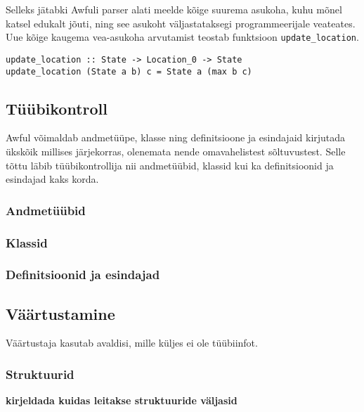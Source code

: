 \documentclass[12pt]{article}
\newcommand\markus[1]{\textcolor{roheline}{\textbf{#1}}}
\begin{document}
      Selleks jätabki Awfuli parser alati meelde kõige suurema asukoha, kuhu mõnel katsel edukalt jõuti, ning see asukoht väljastataksegi programmeerijale veateates. Uue kõige kaugema vea-asukoha arvutamist teostab funktsioon \verb!update_location!.

        \begin{verbatim}update_location :: State -> Location_0 -> State
update_location (State a b) c = State a (max b c)\end{verbatim}
    \subsection{Tüübikontroll}
      Awful võimaldab andmetüüpe, klasse ning definitsioone ja esindajaid kirjutada ükskõik millises järjekorras, olenemata nende omavahelistest sõltuvustest. Selle tõttu läbib tüübikontrollija nii andmetüübid, klassid kui ka definitsioonid ja esindajad kaks korda.
      \subsubsection{Andmetüübid}
        
      \subsubsection{Klassid}
        
      \subsubsection{Definitsioonid ja esindajad}
        
    \subsection{Väärtustamine}
      Väärtustaja kasutab avaldisi, mille küljes ei ole tüübiinfot.
\begin{comment}
    Add_Int_expression_2 |
    Add_Int'_expression_2 Integer |
    Algebraic_expression_2 String [Expression_2] |
    Application_expression_2 Expression_2 Expression_2 |
    Field_expression_2 String |
    Function_expression_2 Pattern_0 Expression_2 |
    Match_expression_2 Expression_2 Matches_2 |
    Struct_expression_2 (Map' Expression_2) |
\end{comment}
      \subsubsection{Struktuurid}
        \markus{kirjeldada kuidas leitakse struktuuride väljasid}
\end{document}
